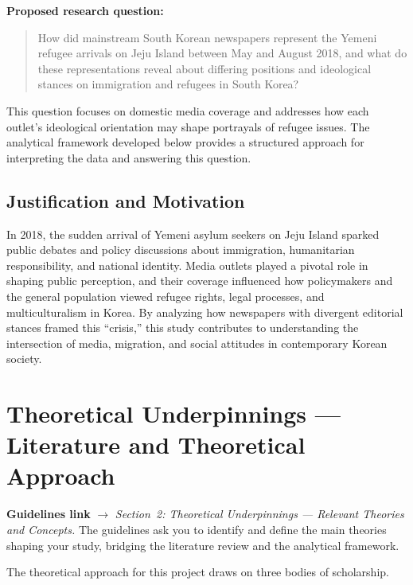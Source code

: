 \documentclass[11pt,a4paper]{article}
\begin{document}
\medskip

\noindent\textbf{Proposed research question:}

\begin{quote}
How did mainstream South Korean newspapers represent the Yemeni refugee arrivals on Jeju Island between May and August 2018, and what do these representations reveal about differing positions and ideological stances on immigration and refugees in South Korea?
\end{quote}

This question focuses on domestic media coverage and addresses how each outlet's ideological orientation may shape portrayals of refugee issues. The analytical framework developed below provides a structured approach for interpreting the data and answering this question.

\subsection{Justification and Motivation}

In 2018, the sudden arrival of Yemeni asylum seekers on Jeju Island sparked public debates and policy discussions about immigration, humanitarian responsibility, and national identity. Media outlets played a pivotal role in shaping public perception, and their coverage influenced how policymakers and the general population viewed refugee rights, legal processes, and multiculturalism in Korea. By analyzing how newspapers with divergent editorial stances framed this ``crisis,'' this study contributes to understanding the intersection of media, migration, and social attitudes in contemporary Korean society.


\section{Theoretical Underpinnings --- Literature and Theoretical Approach}

\begin{crossrefbox}
\textbf{Guidelines link} $\rightarrow$ \textit{Section~2: Theoretical Underpinnings --- Relevant Theories and Concepts.} The guidelines ask you to identify and define the main theories shaping your study, bridging the literature review and the analytical framework.
\end{crossrefbox}

\medskip

The theoretical approach for this project draws on three bodies of scholarship.
\end{document}
